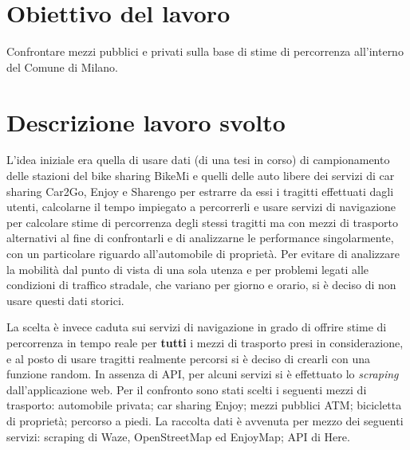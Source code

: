 \documentclass[a4paper,12pt]{article}
\date{\Large{27/01/2021}}
\begin{document}
\vspace{1cm}
	
\section{Obiettivo del lavoro}
Confrontare mezzi pubblici e privati sulla base di stime di percorrenza all'interno del Comune di Milano.

\section{Descrizione lavoro svolto}
L'idea iniziale era quella di usare dati (di una tesi in corso) di campionamento delle stazioni del bike sharing BikeMi e quelli delle auto libere dei servizi di car sharing Car2Go, Enjoy e Sharengo per estrarre da essi i tragitti effettuati dagli utenti, calcolarne il tempo impiegato a percorrerli e usare servizi di navigazione per calcolare stime di percorrenza degli stessi tragitti ma con mezzi di trasporto alternativi al fine di confrontarli e di analizzarne le performance singolarmente, con un particolare riguardo all'automobile di proprietà.
Per evitare di analizzare la mobilità dal punto di vista di una sola utenza e per problemi legati alle condizioni di traffico stradale, che variano per giorno e orario, si è deciso di non usare questi dati storici.

La scelta è invece caduta sui servizi di navigazione in grado di offrire stime di percorrenza in tempo reale per \textbf{tutti} i mezzi di trasporto presi in considerazione, e al posto di usare tragitti realmente percorsi si è deciso di crearli con una funzione random. In assenza di API, per alcuni servizi si è effettuato lo \textit{scraping} dall'applicazione web. Per il confronto sono stati scelti i seguenti mezzi di trasporto: automobile privata; car sharing Enjoy; mezzi pubblici ATM; bicicletta di proprietà; percorso a piedi. La raccolta dati è avvenuta per mezzo dei seguenti servizi: scraping di Waze, OpenStreetMap ed EnjoyMap; API di Here.
\end{document}

